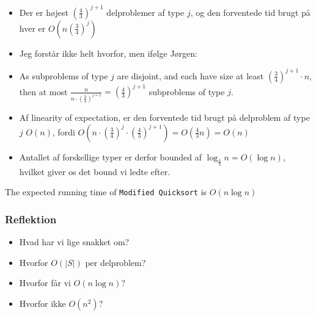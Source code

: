 \documentclass{beamer}
\begin{document}
\begin{frame}[allowframebreaks]
\begin{itemize}
\item Der er højest $(\frac{4}{3})^{j+1}$ delproblemer af type $j$, og den forventede tid brugt på hver er $O(n \left( \frac{3}{4} \right)^{j} )$
\item Jeg forstår ikke helt hvorfor, men ifølge Jørgen: 
\item As subproblems of type $j$ are disjoint, and each have size at least $\left( \frac{3}{4} \right)^{j+1} \cdot n$, then at most $\frac{n}{n \cdot \left( \frac{3}{4} \right)^{j+1}} = \left( \frac{4}{3} \right)^{j+1}$ subproblems of type $j$.
\item Af linearity of expectation, er den forventede tid brugt på delproblem af type $j$ $O(n)$, fordi $O \left ( n \cdot \left( \frac{3}{4} \right)^{j} \cdot \left( \frac{4}{3} \right)^{j+1} \right ) = O \left( \frac{4}{3}n \right) = O(n)$
  \item Antallet af forskellige typer er derfor bounded af $\log_{\frac{4}{3}}n = O(\log n)$, hvilket giver os det bound vi ledte efter.
\end{itemize}
\begin{theorem}[13.21]
The expected running time of \texttt{Modified Quicksort} is $O(n \log n)$
\end{theorem}
\end{frame}


\begin{frame}
  \frametitle{Reflektion}
  \begin{itemize}
  \item Hvad har vi lige snakket om?
  \item Hvorfor $O(|S|)$ per delproblem?
  \item Hvorfor får vi $O(n \log n)$?
  \item Hvorfor ikke $O(n^{2})$?
  \end{itemize}
\end{frame}
\end{document}
